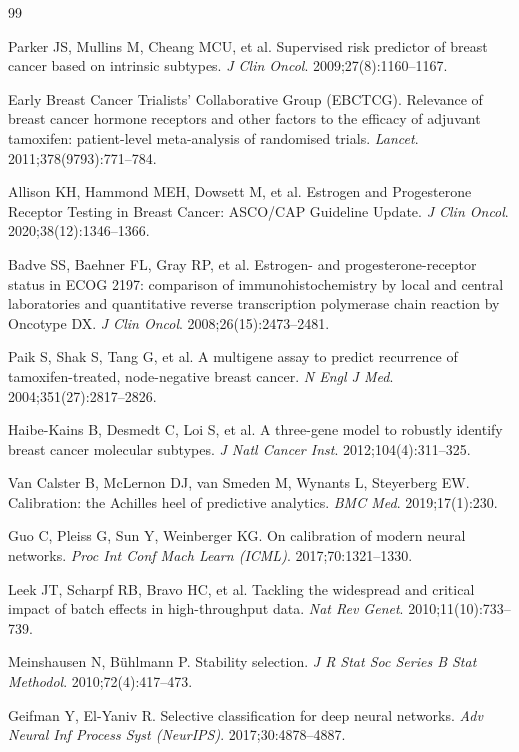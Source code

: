 \documentclass[11pt,a4paper]{article}
\begin{document}
\begin{thebibliography}{99}

 Parker JS, Mullins M, Cheang MCU, et al. Supervised risk predictor of breast cancer based on intrinsic subtypes. \textit{J Clin Oncol}. 2009;27(8):1160--1167.

 Early Breast Cancer Trialists' Collaborative Group (EBCTCG). Relevance of breast cancer hormone receptors and other factors to the efficacy of adjuvant tamoxifen: patient-level meta-analysis of randomised trials. \textit{Lancet}. 2011;378(9793):771--784.

 Allison KH, Hammond MEH, Dowsett M, et al. Estrogen and Progesterone Receptor Testing in Breast Cancer: ASCO/CAP Guideline Update. \textit{J Clin Oncol}. 2020;38(12):1346--1366.

 Badve SS, Baehner FL, Gray RP, et al. Estrogen- and progesterone-receptor status in ECOG 2197: comparison of immunohistochemistry by local and central laboratories and quantitative reverse transcription polymerase chain reaction by Oncotype DX. \textit{J Clin Oncol}. 2008;26(15):2473--2481.

 Paik S, Shak S, Tang G, et al. A multigene assay to predict recurrence of tamoxifen-treated, node-negative breast cancer. \textit{N Engl J Med}. 2004;351(27):2817--2826.

 Haibe-Kains B, Desmedt C, Loi S, et al. A three-gene model to robustly identify breast cancer molecular subtypes. \textit{J Natl Cancer Inst}. 2012;104(4):311--325.

 Van Calster B, McLernon DJ, van Smeden M, Wynants L, Steyerberg EW. Calibration: the Achilles heel of predictive analytics. \textit{BMC Med}. 2019;17(1):230.

 Guo C, Pleiss G, Sun Y, Weinberger KG. On calibration of modern neural networks. \textit{Proc Int Conf Mach Learn (ICML)}. 2017;70:1321--1330.

 Leek JT, Scharpf RB, Bravo HC, et al. Tackling the widespread and critical impact of batch effects in high-throughput data. \textit{Nat Rev Genet}. 2010;11(10):733--739.

 Meinshausen N, B\"uhlmann P. Stability selection. \textit{J R Stat Soc Series B Stat Methodol}. 2010;72(4):417--473.

 Geifman Y, El-Yaniv R. Selective classification for deep neural networks. \textit{Adv Neural Inf Process Syst (NeurIPS)}. 2017;30:4878--4887.

\end{thebibliography}
\end{document}
